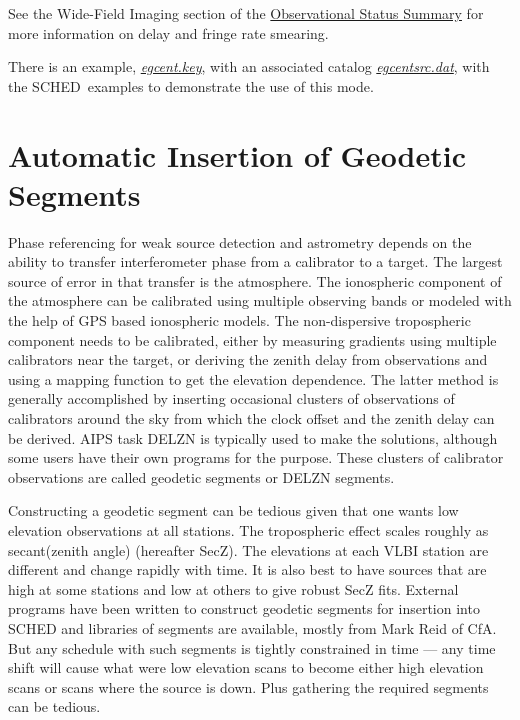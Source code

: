 \documentclass{report}
\newcommand{\schedb}{{\sc SCHED~}}
\begin{document}
See the Wide-Field Imaging section of the
{\href{https://science.nrao.edu/facilities/vlba/docs/manuals/oss}
{Observational Status Summary}}
for more information on delay and fringe rate smearing.


There is an example, 
{\href{examples/egcent.key}{{\sl egcent.key}}}, with an
associated catalog 
{\href{examples/egcentsrc.dat}{{\sl egcentsrc.dat}}},
with the \schedb examples to demonstrate the use of this mode.

\section{\label{SEC:GEOSEG}Automatic Insertion of Geodetic Segments}

Phase referencing for weak source detection and astrometry depends on
the ability to transfer interferometer phase from a calibrator to a
target.  The largest source of error in that transfer is the
atmosphere.  The ionospheric component of the atmosphere can be
calibrated using multiple observing bands or modeled with the help of
GPS based ionospheric models.  The non-dispersive tropospheric
component needs to be calibrated, either by measuring gradients using
multiple calibrators near the target, or deriving the zenith delay
from observations and using a mapping function to get the elevation
dependence.  The latter method is generally accomplished by inserting
occasional clusters of observations of calibrators around the sky from
which the clock offset and the zenith delay can be derived.  AIPS task
DELZN is typically used to make the solutions, although some users
have their own programs for the purpose.  These clusters of calibrator
observations are called geodetic segments or DELZN segments.

Constructing a geodetic segment can be tedious given that one wants
low elevation observations at all stations.  The tropospheric effect
scales roughly as secant(zenith angle) (hereafter SecZ).  The
elevations at each VLBI station are different and change rapidly with
time.  It is also best to have sources that are high at some stations
and low at others to give robust SecZ fits.  External programs have
been written to construct geodetic segments for insertion into SCHED and
libraries of segments are available, mostly from Mark Reid of CfA.
But any schedule with such segments is tightly constrained in time ---
any time shift will cause what were low elevation scans to become
either high elevation scans or scans where the source is down.  Plus
gathering the required segments can be tedious.
\end{document}
